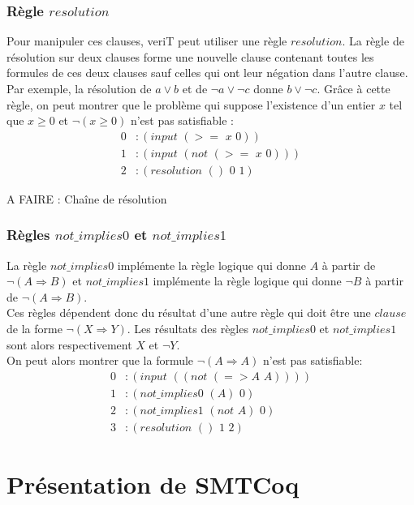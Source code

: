 \documentclass[11pt]{article}
\begin{document}
\subsubsection{Règle $resolution$}

Pour manipuler ces clauses, veriT peut utiliser une règle $resolution$. La règle de résolution sur deux clauses forme une nouvelle clause contenant toutes les formules de ces deux clauses sauf celles qui ont leur négation dans l'autre clause. Par exemple, la résolution de $a \vee b$ et de $\neg a \vee \neg c$ donne $b \vee \neg c$. Grâce à cette règle, on peut montrer que le problème qui suppose l'existence d'un entier $x$ tel que $x \geq 0$ et $\neg (x \geq 0)$ n'est pas satisfiable : 
\begin{align*}
0&:(input \,\, (>= \,\,x \,\,0)) \\
1&:(input \,\, (not \,\, (>= \,\,x \,\,0))) \\
2&:(resolution \,\,() \,\,0\,\, 1)
\end{align*}

A FAIRE : Chaîne de résolution


\subsubsection{Règles $not\_implies0$ et $not\_implies1$} \label{not_implies}
La règle $not\_implies0$ implémente la règle logique qui donne $A$ à partir de $\neg (A \Rightarrow B)$ et $not\_implies1$ implémente la règle logique qui donne $\neg B$ à partir de $\neg (A \Rightarrow B)$. \\

Ces règles dépendent donc du résultat d'une autre règle qui doit être une $clause$ de la forme $\neg (X \Rightarrow Y)$. Les résultats des règles $not\_implies0$ et $not\_implies1$ sont alors respectivement $X$ et $\neg Y$. \\

On peut alors montrer que la formule $\neg (A \Rightarrow A)$ n'est pas satisfiable:
\begin{align*}
  0&:(input\,\, ((not\,\, (=> A \,\,A)))) \\
  1&:(not\_implies0\,\, (A)\,\, 0) \\
  2&:(not\_implies1\,\, (not\,\, A) \,\,0) \\
  3&:(resolution\,\, ()\,\, 1\,\, 2)
\end{align*}


\newpage
\section{Présentation de SMTCoq}
\end{document}
